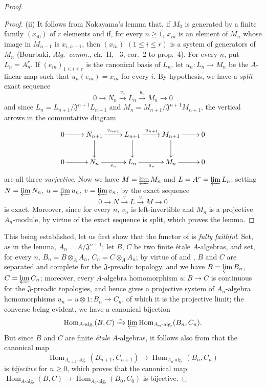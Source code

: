 \begin{proof}
\begin{proof}
(ii) It follows from Nakayama's lemma that, if $M_0$ is generated by a finite family $(x_{i0})$ of $r$ elements and if, for every $n\geq 1$, $x_{in}$ is an element of $M_n$ whose image in $M_{n-1}$ is $x_{i,n-1}$, then $(x_{in})$ $(1\leq i\leq r)$ is a system of generators of $M_n$ (Bourbaki, \emph{Alg.\ comm.}, ch.~II, \textsection~3, cor.~2 to prop.~4).  For every $n$, put $L_n=A_n^r$.  If $(e_{in})_{1\leq i\leq r}$ is the canonical basis of $L_n$, let $u_n:L_n\to M_n$ be the $A$-linear map such that $u_n(e_{in})=x_{in}$ for every $i$.
By hypothesis, we have a \emph{split} exact sequence
\[
0\to N_n\xrightarrow{v_n} L_n\xrightarrow{u_n} M_n\to 0
\]
and since $L_n=L_{n+1}/\mathfrak{J}^{n+1}L_{n+1}$ and $M_n=M_{n+1}/\mathfrak{J}^{n+1}M_{n+1}$, the vertical arrows in the commutative diagram
\[
\xymatrix{
0\ar[r] & N_{n+1}\ar[r]^{v_{n+1}}\ar[d] & L_{n+1}\ar[r]^{u_{n+1}}\ar[d] & M_{n+1}\ar[r]\ar[d] & 0\\
0\ar[r] & N_n\ar[r]_{v_n} & L_n\ar[r]_{u_n} & M_n\ar[r] & 0
}
\]
are all three \emph{surjective}.
Now we have $M=\varprojlim M_n$ and $L=A^r=\varprojlim L_n$;
setting $N=\varprojlim N_n$, $u=\varprojlim u_n$, $v=\varprojlim v_n$, by  the exact sequence
\[
\label{IV.18.3.2.2}
0\to N\xrightarrow{v} L\xrightarrow{u} M\to 0
\tag{18.3.2.2}
\]
is exact.
Moreover, since for every $n$, $v_n$ is left-invertible and $M_n$ is a projective $A_n$-module, by virtue of  the exact sequence  is split, which proves the lemma.
\end{proof}

This being established, let us first show that the functor of  is \emph{fully faithful}.
Set, as in the lemma, $A_n=A/\mathfrak{J}^{n+1}$;
let $B$, $C$ be two finite \'etale $A$-algebras, and set, for every $n$, $B_n=B\otimes_A A_n$, $C_n=C\otimes_A A_n$;
by virtue of  and , $B$ and $C$ are separated and complete for the $\mathfrak{J}$-preadic topology, and we have $B=\varprojlim B_n$, $C=\varprojlim C_n$;
moreover, every $A$-algebra homomorphism $u:B\to C$ is continuous for the $\mathfrak{J}$-preadic topologies, and hence gives a projective system of $A_n$-algebra homomorphisms $u_n=u\otimes 1:B_n\to C_n$, of which it is the projective limit;
the converse being evident, we have a canonical bijection
\[
\operatorname{Hom}_{A\text{-}\mathrm{alg.}}(B,C)\xrightarrow{\sim}\varprojlim\operatorname{Hom}_{A_n\text{-}\mathrm{alg.}}(B_n,C_n).
\]
But since $B$ and $C$ are finite \emph{\'etale} $A$-algebras, it follows also from  that the canonical map
\[
\operatorname{Hom}_{A_{n+1}\text{-}\mathrm{alg.}}(B_{n+1},C_{n+1})\to\operatorname{Hom}_{A_n\text{-}\mathrm{alg.}}(B_n,C_n)
\]
is \emph{bijective} for $n\geq 0$, which proves that the canonical map $\operatorname{Hom}_{A\text{-}\mathrm{alg.}}(B,C)\to\operatorname{Hom}_{A_0\text{-}\mathrm{alg.}}(B_0,C_0)$ is bijective.


\end{proof}
